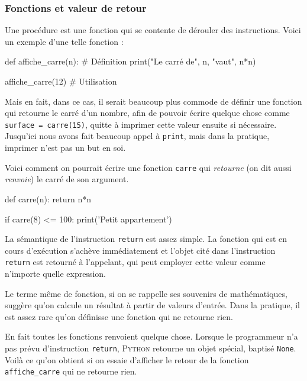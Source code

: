 \subsubsection[Fonctions et valeur de retour]{Fonctions et valeur de retour}
\label{subsub:XI.3.3.2}

Une procédure est une fonction qui se contente de dérouler des instructions. Voici un exemple d'une telle fonction :

\begin{idleconsole}
\begin{pyconsole}
def affiche_carre(n): # Définition
    print("Le carré de", n, "vaut", n*n)

affiche_carre(12) # Utilisation
\end{pyconsole}
\end{idleconsole}

Mais en fait, dans ce cas, il serait beaucoup plus commode de définir une fonction qui retourne le carré d'un nombre, afin de pouvoir écrire quelque chose comme \texttt{surface = carre(15)}, quitte à imprimer cette valeur ensuite si nécessaire. Jusqu'ici nous avons fait beaucoup appel à \texttt{print}, mais dans la pratique, imprimer n'est pas un but en soi.

Voici comment on pourrait écrire une fonction \texttt{carre} qui \emph{retourne} (on dit aussi \emph{renvoie}) le carré de son argument.

\begin{idleconsole}
\begin{pyconsole}
def carre(n):
    return n*n

if carre(8) <= 100:
    print('Petit appartement')

\end{pyconsole}
\end{idleconsole}

La sémantique de l'instruction \texttt{return} est assez simple. La fonction qui est en cours d'exécution s'achève immédiatement et l'objet cité dans l'instruction \texttt{return} est retourné à l'appelant, qui peut employer cette valeur comme n'importe quelle expression.

Le terme même de fonction, si on se rappelle ses souvenirs de mathématiques, suggère qu'on calcule un résultat à partir de valeurs d'entrée. Dans la pratique, il est assez rare qu'on définisse une fonction qui ne retourne rien.

En fait toutes les fonctions renvoient quelque chose. Lorsque le programmeur n'a pas prévu d'instruction \texttt{return}, \textsc{Python} retourne un objet spécial, baptisé \texttt{None}. Voilà ce qu'on obtient si on essaie d'afficher le retour de la fonction \texttt{affiche\_carre} qui ne retourne rien.

